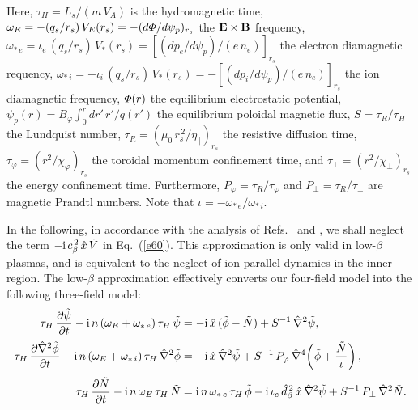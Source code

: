 \documentclass[12pt,prb,aps]{revtex4-1}
\begin{document}
Here, 
$\tau_H = L_s/(m\,V_A)$ 
is the  hydromagnetic time, 
$\omega_E =-(q_s/r_s)\,V_E(r_s)=- (d{\mit\Phi}/{d\psi_p})_{r_s}$
  the 
${\bf E}\times {\bf B}$ frequency, 
$\omega_{\ast\,e} = \iota_e\,(q_s/r_s)\,V_\ast(r_s) = [(dp_e/d\psi_p)/(e\,n_e)]_{r_s}$
the electron diamagnetic requency,
$\omega_{\ast\,i} =-\iota_i\,(q_s/r_s)\,V_\ast(r_s)=- [(dp_i/d\psi_p)/(e\,n_e)]_{r_s}$
 the   ion diamagnetic frequency,  ${\mit\Phi}(r)$ the equilibrium electrostatic potential, $\psi_p(r)= B_\varphi\int_0^r dr'\,r'/q(r')$ the equilibrium poloidal magnetic flux, 
$S=\tau_R/\tau_H$
 the   Lundquist number, 
$\tau_R =( \mu_0\,r_s^{\,2}/\eta_\parallel)_{r_s}$
 the resistive diffusion time, 
$\tau_\varphi
= (r^2/\chi_\varphi)_{r_s}$
the  toroidal momentum confinement time, and 
$\tau_\perp = (r^2/\chi_\perp)_{r_s}$ the energy confinement time.
  Furthermore, $P_\varphi = \tau_R/\tau_\varphi$ and $P_\perp = \tau_R/\tau_\perp$ are  magnetic Prandtl numbers. 
  Note that $\iota=-\omega_{\ast\,e}/\omega_{\ast\,i}$. 

In the following, in accordance with the analysis of Refs.~ and , we shall
neglect the term  $-{\rm i}\,c_\beta^{\,2}\,\hat{x}\,\tilde{V}$ in Eq.~(\ref{e60}). This approximation is only valid in low-$\beta$ plasmas, and 
 is equivalent to  the neglect of ion parallel dynamics in the inner region. The low-$\beta$ approximation effectively converts our four-field model into the following three-field model:
\begin{align}\label{e64}
\tau_H\,\frac{\partial\tilde{\psi}}{\partial t}-{\rm i}\,n\,(\omega_E +\omega_{\ast\,e})\,\tau_H\,\tilde{\psi} &= -{\rm i} \,\hat{x}\,(\tilde{\phi}-\tilde{N})+ S^{-1}\,\hat{\nabla}^2\tilde{\psi},\\[0.5ex]
\tau_H\,\frac{\partial\hat{\nabla}^2\tilde{\phi}}{\partial t}-{\rm i}\,n\,(\omega_E+\omega_{\ast\,i})\,\tau_H\,\hat{\nabla}^2\tilde{\phi} &= -{\rm i}\,\hat{x}\,\hat{\nabla}^2\tilde{\psi}+S^{-1}\,P_\varphi\,\hat{\nabla}^4\!\left(\tilde{\phi} + \frac{\tilde{N}}{\iota}\right),\\[0.5ex]
\tau_H\,\frac{\partial\tilde{N}}{\partial t}-{\rm i}\,n\,\omega_E\,\tau_H\,\tilde{N} &={\rm i}\,n\,\omega_{\ast\,e}\,\tau_H\,\tilde{\phi} - {\rm i}\,\iota_e\,\hat{d}_\beta^{\,2}\,\hat{x}\,\hat{\nabla}^2\tilde{\psi}+ S^{-1}\,P_\perp\,\hat{\nabla}^2 \tilde{N}.\label{e66}
\end{align}
\end{document}
